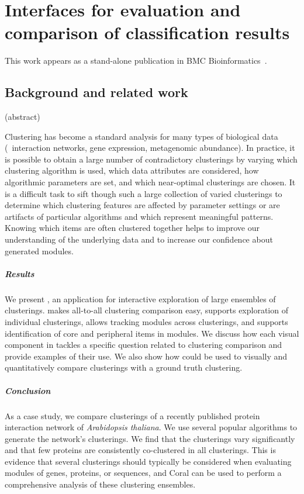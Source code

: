\documentclass[12pt]{cmuthesis}
\begin{document}
\chapter{Interfaces for evaluation and comparison of classification results}

This work appears as a stand-alone publication in BMC Bioinformatics~\cite{Filippova2012}.

\section{Background and related work}

  (abstract)

  Clustering has become a standard analysis  for many
  types of biological data (\eg~interaction networks, gene expression,
  metagenomic abundance). In practice, it is possible to obtain a large number of
  contradictory clusterings by varying which clustering algorithm is used, which
  data attributes are considered, how algorithmic parameters are set, and  which
  near-optimal clusterings are chosen. It is a difficult task to sift though such
  a large collection of varied clusterings to determine which clustering features
  are affected by parameter settings or are artifacts of particular algorithms and
  which represent meaningful patterns. Knowing which items are often clustered
  together helps to improve our understanding of the underlying data and to
  increase our confidence about generated modules.

  \paragraph{Results} We present \Coral, an application for interactive
  exploration of large ensembles of clusterings. \Coral makes all-to-all
  clustering comparison easy, supports exploration of individual clusterings,
  allows tracking modules across clusterings, and supports identification of core
  and peripheral items in modules. We discuss how each visual component in \Coral
  tackles a specific question related to clustering comparison and provide
  examples of their use. We also show how \Coral could be used to visually and
  quantitatively compare clusterings with a ground truth clustering.

  \paragraph{Conclusion} As a case study, we compare clusterings of a recently
  published protein interaction network of \textit{Arabidopsis thaliana}. We use
  several popular algorithms to generate the network's clusterings. We find that
  the clusterings vary significantly and that few proteins are consistently
  co-clustered in all clusterings. This is evidence that several clusterings
  should typically be considered when evaluating modules of genes, proteins, or
  sequences, and Coral can be used to perform a comprehensive analysis of these
  clustering ensembles.
\end{document}
